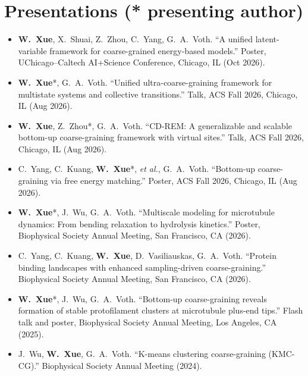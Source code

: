 \documentclass[letterpaper,10.5pt]{article}
\newcommand{\resumeItem}[1]{\item\small{#1\vspace{-1pt}}}
\begin{document}
\section{Presentations \normalfont\small\upshape(* presenting author)}
  \begin{itemize}[leftmargin=0.18in, itemsep=0pt]
    \resumeItem{\textbf{W.\ Xue}, X.\ Shuai, Z.\ Zhou, C.\ Yang, G.\ A.\ Voth. ``A unified latent-variable framework for coarse-grained energy-based models.'' Poster, UChicago--Caltech AI+Science Conference, Chicago, IL (Oct 2026).}
    \resumeItem{\textbf{W.\ Xue}*, G.\ A.\ Voth. ``Unified ultra-coarse-graining framework for multistate systems and collective transitions.'' Talk, ACS Fall 2026, Chicago, IL (Aug 2026).}
    \resumeItem{\textbf{W.\ Xue}, Z.\ Zhou*, G.\ A.\ Voth. ``CD-REM: A generalizable and scalable bottom-up coarse-graining framework with virtual sites.'' Talk, ACS Fall 2026, Chicago, IL (Aug 2026).}
    \resumeItem{C.\ Yang, C.\ Kuang, \textbf{W.\ Xue}*, \textit{et al.}, G.\ A.\ Voth. ``Bottom-up coarse-graining via free energy matching.'' Poster, ACS Fall 2026, Chicago, IL (Aug 2026).}
    \resumeItem{\textbf{W.\ Xue}*, J.\ Wu, G.\ A.\ Voth. ``Multiscale modeling for microtubule dynamics: From bending relaxation to hydrolysis kinetics.'' Poster, Biophysical Society Annual Meeting, San Francisco, CA (2026).}
    \resumeItem{C.\ Yang, C.\ Kuang, \textbf{W.\ Xue}, D.\ Vasiliauskas, G.\ A.\ Voth. ``Protein binding landscapes with enhanced sampling-driven coarse-graining.'' Biophysical Society Annual Meeting, San Francisco, CA (2026).}
    \resumeItem{\textbf{W.\ Xue}*, J.\ Wu, G.\ A.\ Voth. ``Bottom-up coarse-graining reveals formation of stable protofilament clusters at microtubule plus-end tips.'' Flash talk and poster, Biophysical Society Annual Meeting, Los Angeles, CA (2025).}
    \resumeItem{J.\ Wu, \textbf{W.\ Xue}, G.\ A.\ Voth. ``K-means clustering coarse-graining (KMC-CG).'' Biophysical Society Annual Meeting (2024).}
  \end{itemize}

\end{document}
